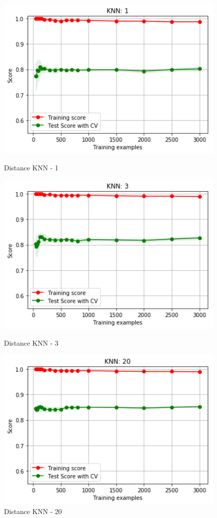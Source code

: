 \documentclass[h]{article}
\begin{document}
\begin{figure}[H]
      \includegraphics[width=1\textwidth,keepaspectratio]{1_knn_1_2.png} 
      \caption*{Distance KNN - 1} 
   \endminipage\hfill
      \includegraphics[width=1\textwidth,keepaspectratio]{1_knn_3_2.png} 
      \caption*{Distance KNN - 3} 
   \endminipage\hfill
      \includegraphics[width=1\textwidth,keepaspectratio]{1_knn_20_2.png} 
      \caption*{Distance KNN - 20} 
   \endminipage\hfill
\end{figure}
\end{document}
